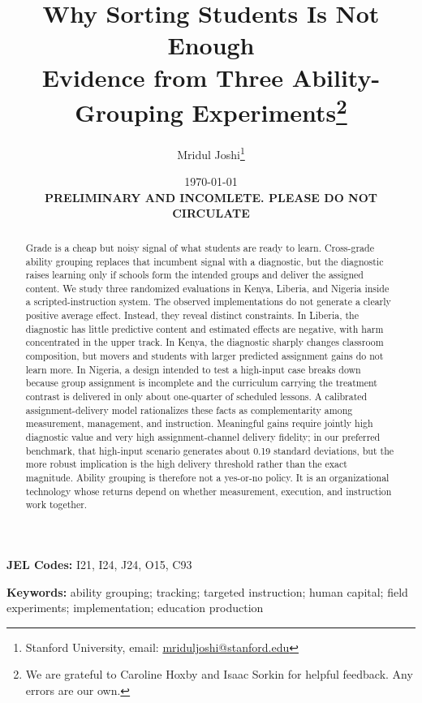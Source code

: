 \documentclass[11pt]{article}
\title{Why Sorting Students Is Not Enough \\ Evidence from Three Ability-Grouping Experiments\footnote{We are grateful to Caroline Hoxby and Isaac Sorkin for helpful feedback. Any errors are our own.} }
\begin{document}
\begin{titlepage}
\author{Mridul Joshi\thanks{Stanford University, email: \protect\href{mailto:mriduljoshi@stanford.edu}{mriduljoshi@stanford.edu}}}

\date{\today\\ \vspace{0.5cm} \textbf{PRELIMINARY AND INCOMLETE. PLEASE DO NOT CIRCULATE} }
\maketitle

\begin{abstract}\noindent
Grade is a cheap but noisy signal of what students are ready to learn. Cross-grade ability grouping replaces that incumbent signal with a diagnostic, but the diagnostic raises learning only if schools form the intended groups and deliver the assigned content. We study three randomized evaluations in Kenya, Liberia, and Nigeria inside a scripted-instruction system. The observed implementations do not generate a clearly positive average effect. Instead, they reveal distinct constraints. In Liberia, the diagnostic has little predictive content and estimated effects are negative, with harm concentrated in the upper track. In Kenya, the diagnostic sharply changes classroom composition, but movers and students with larger predicted assignment gains do not learn more. In Nigeria, a design intended to test a high-input case breaks down because group assignment is incomplete and the curriculum carrying the treatment contrast is delivered in only about one-quarter of scheduled lessons. A calibrated assignment-delivery model rationalizes these facts as complementarity among measurement, management, and instruction. Meaningful gains require jointly high diagnostic value and very high assignment-channel delivery fidelity; in our preferred benchmark, that high-input scenario generates about 0.19 standard deviations, but the more robust implication is the high delivery threshold rather than the exact magnitude. Ability grouping is therefore not a yes-or-no policy. It is an organizational technology whose returns depend on whether measurement, execution, and instruction work together.

\end{abstract}
\vspace{0.2cm}
\noindent\textbf{JEL Codes:} I21, I24, J24, O15, C93

\noindent\textbf{Keywords:} ability grouping; tracking; targeted instruction; human capital; field experiments; implementation; education production

\setcounter{page}{0}
\thispagestyle{empty}
\end{titlepage}
\doublespacing
\end{document}
